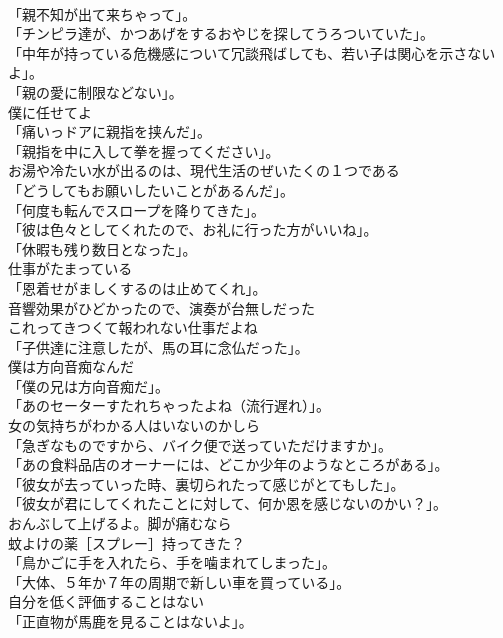 \documentclass[8pt]{extreport}
\begin{document}
\begin{CJK}{UTF8}{min}
\\	「親不知が出て来ちゃって」。	
\\	「チンピラ達が、かつあげをするおやじを探してうろついていた」。	
\\	「中年が持っている危機感について冗談飛ばしても、若い子は関心を示さないよ」。	
\\	「親の愛に制限などない」。	
\\	僕に任せてよ	
\\	「痛いっドアに親指を挟んだ」。	
\\	「親指を中に入して拳を握ってください」。	
\\	お湯や冷たい水が出るのは、現代生活のぜいたくの１つである	
\\	「どうしてもお願いしたいことがあるんだ」。	
\\	「何度も転んでスロープを降りてきた」。	
\\	「彼は色々としてくれたので、お礼に行った方がいいね」。	
\\	「休暇も残り数日となった」。	
\\	仕事がたまっている	
\\	「恩着せがましくするのは止めてくれ」。	
\\	音響効果がひどかったので、演奏が台無しだった	
\\	これってきつくて報われない仕事だよね	
\\	「子供達に注意したが、馬の耳に念仏だった」。	
\\	僕は方向音痴なんだ	
\\	「僕の兄は方向音痴だ」。	
\\	「あのセーターすたれちゃったよね（流行遅れ）」。	
\\	女の気持ちがわかる人はいないのかしら	
\\	「急ぎなものですから、バイク便で送っていただけますか」。	
\\	「あの食料品店のオーナーには、どこか少年のようなところがある」。	
\\	「彼女が去っていった時、裏切られたって感じがとてもした」。	
\\	「彼女が君にしてくれたことに対して、何か恩を感じないのかい？」。	
\\	おんぶして上げるよ。脚が痛むなら	
\\	蚊よけの薬［スプレー］持ってきた？	
\\	「鳥かごに手を入れたら、手を噛まれてしまった」。	
\\	「大体、５年か７年の周期で新しい車を買っている」。	
\\	自分を低く評価することはない	
\\	「正直物が馬鹿を見ることはないよ」。	

\end{CJK}
\end{document}
